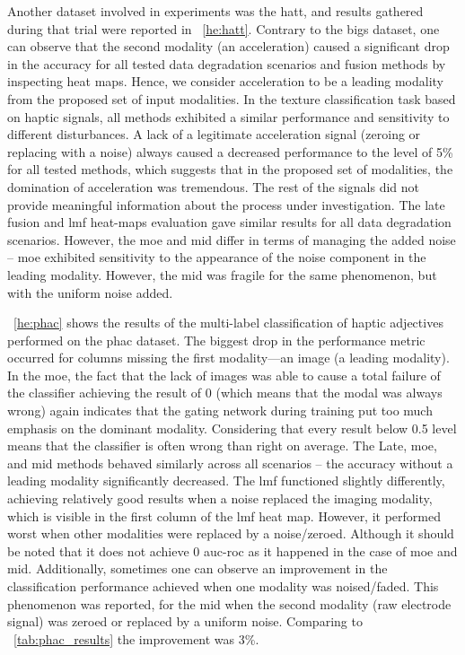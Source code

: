 \documentclass[a4paper, 10pt, twoside]{report}
\begin{document}
Another dataset involved in experiments was the \acrshort{hatt}, and results gathered during that trial were reported in \Figure ~\ref{he:hatt}. Contrary to the \acrshort{bigs} dataset, one can observe that the second modality (an acceleration) caused a significant drop in the accuracy for all tested data degradation scenarios and fusion methods by inspecting heat maps. Hence, we consider acceleration to be a leading modality from the proposed set of input modalities. In the texture classification task based on haptic signals, all methods exhibited a similar performance and sensitivity to different disturbances. A lack of a legitimate acceleration signal (zeroing or replacing with a noise) always caused a decreased performance to the level of  5\% for all tested methods, which suggests that in the proposed set of modalities, the domination of acceleration was tremendous. The rest of the signals did not provide meaningful information about the process under investigation. The late fusion and \acrshort{lmf} heat-maps evaluation gave similar results for all data degradation scenarios. However, the \acrshort{moe} and \acrshort{mid} differ in terms of managing the added noise -- \acrshort{moe} exhibited sensitivity to the appearance of the noise component in the leading modality. However, the \acrshort{mid} was fragile for the same phenomenon, but with the uniform noise added. 

\Figure~\ref {he:phac} shows the results of the multi-label classification of haptic adjectives performed on the \acrshort{phac} dataset. The biggest drop in the performance metric occurred for columns missing the first modality---an image (a leading modality). In the \acrshort{moe}, the fact that the lack of images was able to cause a total failure of the classifier achieving the result of 0 (which means that the modal was always wrong) again indicates that the gating network during training put too much emphasis on the dominant modality. Considering that every result below 0.5 level means that the classifier is often wrong than right on average. The Late, \acrshort{moe}, and \acrshort{mid} methods behaved similarly across all scenarios -- the accuracy without a leading modality significantly decreased. The \acrshort{lmf} functioned slightly differently, achieving relatively good results when a noise replaced the imaging modality, which is visible in the first column of the \acrshort{lmf} heat map. However, it performed worst when other modalities were replaced by a noise/zeroed. Although it should be noted that it does not achieve 0 \acrshort{auc}-\acrshort{roc} as it happened in the case of \acrshort{moe} and \acrshort{mid}. Additionally, sometimes one can observe an improvement in the classification performance achieved when one modality was noised/faded. This phenomenon was reported, \eg for the \acrshort{mid} when the second modality (raw electrode signal) was zeroed or replaced by a uniform noise. Comparing to \Table~\ref{tab:phac_results} the improvement was 3\%.
\end{document}
